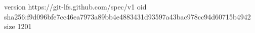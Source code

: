 version https://git-lfs.github.com/spec/v1
oid sha256:f9d096bfe7cc46ea7973a89bb4e4883431d93597a43bac978cc94d60715b4942
size 1201
